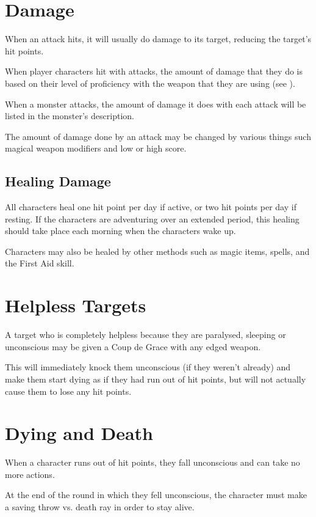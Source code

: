 \begin{multicols*}{2}
\section{Damage}
When an attack hits, it will usually do damage to its target, reducing the target’s hit points.

When player characters hit with attacks, the amount of damage that they do is based on their level of proficiency with the weapon that they are using (see ).

When a monster attacks, the amount of damage it does with each attack will be listed in the monster’s description.

The amount of damage done by an attack may be changed by various things such magical weapon modifiers and low or high  score.

\subsection{Healing Damage}
All characters heal one hit point per day if active, or two hit points per day if resting. If the characters are adventuring over an extended period, this healing should take place each morning when the characters wake up.

Characters may also be healed by other methods such as magic items, spells, and the First Aid skill.

\section{Helpless Targets}
A target who is completely helpless because they are paralysed, sleeping or unconscious may be given a Coup de Grace with any edged weapon.

This will immediately knock them unconscious (if they weren’t already) and make them start dying as if they had run out of hit points, but will not actually cause them to lose any hit points.

\section{Dying and Death}\label{sec:Dying and Death}
When a character runs out of hit points, they fall unconscious and can take no more actions.

At the end of the round in which they fell unconscious, the character must make a saving throw vs. death ray in order to stay alive.


\end{multicols*}
